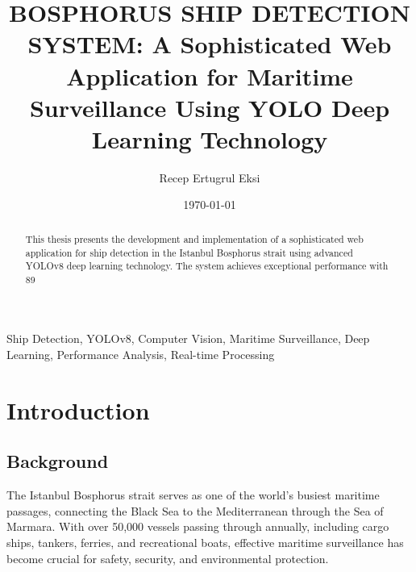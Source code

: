 \documentclass[a4paper,11pt]{article}
\title{BOSPHORUS SHIP DETECTION SYSTEM: A Sophisticated Web Application for Maritime Surveillance Using YOLO Deep Learning Technology}
\author{Recep Ertugrul Eksi}
\affil{Uskudar University, Computer Engineering Department}
\date{\today}
\begin{document}
\maketitle

\begin{abstract}
This thesis presents the development and implementation of a sophisticated web application for ship detection in the Istanbul Bosphorus strait using advanced YOLOv8 deep learning technology. The system achieves exceptional performance with 89%
\end{abstract}

\begin{keywords}
Ship Detection, YOLOv8, Computer Vision, Maritime Surveillance, Deep Learning, Performance Analysis, Real-time Processing
\end{keywords}

\tableofcontents

\section{Introduction}

\subsection{Background}
The Istanbul Bosphorus strait serves as one of the world's busiest maritime passages, connecting the Black Sea to the Mediterranean through the Sea of Marmara. With over 50,000 vessels passing through annually, including cargo ships, tankers, ferries, and recreational boats, effective maritime surveillance has become crucial for safety, security, and environmental protection.
\end{document}
